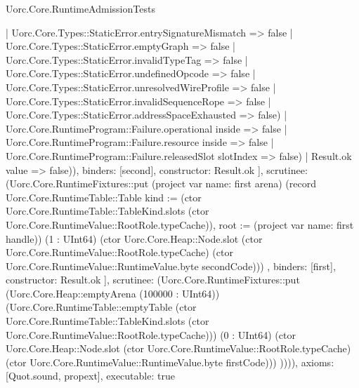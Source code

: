 \begin{lexlean}{Uorc.Core.RuntimeAdmissionTests}
\begin{semanticmodule}
{{{{{                        | Uorc.Core.Types::StaticError.entrySignatureMismatch => false
                        | Uorc.Core.Types::StaticError.emptyGraph => false
                        | Uorc.Core.Types::StaticError.invalidTypeTag => false
                        | Uorc.Core.Types::StaticError.undefinedOpcode => false
                        | Uorc.Core.Types::StaticError.unresolvedWireProfile => false
                        | Uorc.Core.Types::StaticError.invalidSequenceRope => false
                        | Uorc.Core.Types::StaticError.addressSpaceExhausted => false)
                      | Uorc.Core.RuntimeProgram::Failure.operational inside => false
                      | Uorc.Core.RuntimeProgram::Failure.resource inside => false
                      | Uorc.Core.RuntimeProgram::Failure.releasedSlot slotIndex => false)
                    | Result.ok value => false)),
                  binders: [second],
                  constructor: Result.ok
                }
              ],
              scrutinee: (Uorc.Core.RuntimeFixtures::put (project var{
                name: first
              } arena) (record Uorc.Core.RuntimeTable::Table {kind := (ctor Uorc.Core.RuntimeTable::TableKind.slots (ctor Uorc.Core.RuntimeValue::RootRole.typeCache)), root := (project var{
                name: first
              } handle)}) (1 : UInt64) (ctor Uorc.Core.Heap::Node.slot (ctor Uorc.Core.RuntimeValue::RootRole.typeCache) (ctor Uorc.Core.RuntimeValue::RuntimeValue.byte secondCode)))
            },
            binders: [first],
            constructor: Result.ok
          }
        ],
        scrutinee: (Uorc.Core.RuntimeFixtures::put (Uorc.Core.Heap::emptyArena (100000 : UInt64)) (Uorc.Core.RuntimeTable::emptyTable (ctor Uorc.Core.RuntimeTable::TableKind.slots (ctor Uorc.Core.RuntimeValue::RootRole.typeCache))) (0 : UInt64) (ctor Uorc.Core.Heap::Node.slot (ctor Uorc.Core.RuntimeValue::RootRole.typeCache) (ctor Uorc.Core.RuntimeValue::RuntimeValue.byte firstCode)))
      })))),
  axioms: [Quot.sound, propext],
  executable: true
}


\end{semanticmodule}
\end{lexlean}

